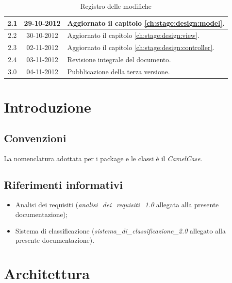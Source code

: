\documentclass[10pt,a4paper,headinclude,footinclude,hidelinks]{scrreprt} %
\begin{document}
\begin{table}[ht]
\begin{tabular}{|c|c|l|}
	2.1 & 29-10-2012 & Aggiornato il capitolo \ref{ch:stage:design:model}. \\ \hline
	2.2 & 30-10-2012 & Aggiornato il capitolo \ref{ch:stage:design:view}. \\ \hline
	2.3 & 02-11-2012 & Aggiornato il capitolo \ref{ch:stage:design:controller}. \\ \hline
	2.4 & 03-11-2012 & Revisione integrale del documento. \\ \hline
	3.0 & 04-11-2012 & Pubblicazione della terza versione. \\ \hline
	\end{tabular}
	\caption{Registro delle modifiche}
	\label{tab:stage:wp:workload}
	\end{table}

	\tableofcontents

	\listoffigures

	\chapter{Introduzione}
	\label{ch:stage:design:intro}

	\section{Convenzioni}
	La nomenclatura adottata per i package e le classi è il \textit{CamelCase}.

	\section{Riferimenti informativi}
	\begin{itemize}
	\item Analisi dei requisiti (\textit{analisi\_dei\_requisiti\_1.0} allegata alla presente documentazione);
	\item Sistema di classificazione (\textit{sistema\_di\_classificazione\_2.0} allegato alla presente documentazione).
	\end{itemize}

	\chapter{Architettura}
	\label{ch:stage:design:architettura}
\end{document}
